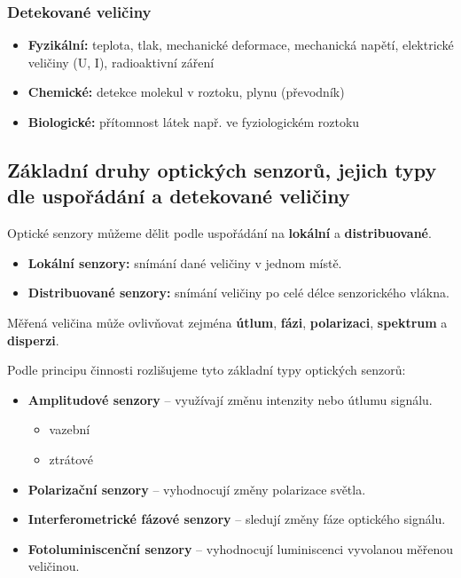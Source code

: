 \documentclass[a4paper, 12pt]{article}
\begin{document}
            \subsubsection{Detekované veličiny}
                \begin{itemize}
                    \item \textbf{Fyzikální:} teplota, tlak, mechanické deformace, mechanická napětí, elektrické veličiny (U, I), radioaktivní záření
                    \item \textbf{Chemické:} detekce molekul v roztoku, plynu (převodník)
                    \item \textbf{Biologické:} přítomnost látek např. ve fyziologickém roztoku
                \end{itemize}

        \subsection{Základní druhy optických senzorů, jejich typy dle uspořádání a detekované veličiny}
            Optické senzory můžeme dělit podle uspořádání na \textbf{lokální} a \textbf{distribuované}.

            \begin{itemize}
                \item \textbf{Lokální senzory:} snímání dané veličiny v jednom místě.
                \item \textbf{Distribuované senzory:} snímání veličiny po celé délce senzorického vlákna.
            \end{itemize}

            Měřená veličina může ovlivňovat zejména \textbf{útlum}, \textbf{fázi}, \textbf{polarizaci}, \textbf{spektrum} a \textbf{disperzi}.

            Podle principu činnosti rozlišujeme tyto základní typy optických senzorů:
            \begin{itemize}
                \item \textbf{Amplitudové senzory} -- využívají změnu intenzity nebo útlumu signálu.
                \begin{itemize}
                    \item vazební
                    \item ztrátové
                \end{itemize}
                \item \textbf{Polarizační senzory} -- vyhodnocují změny polarizace světla.
                \item \textbf{Interferometrické fázové senzory} -- sledují změny fáze optického signálu.
                \item \textbf{Fotoluminiscenční senzory} -- vyhodnocují luminiscenci vyvolanou měřenou veličinou.
            \end{itemize}
\end{document}
